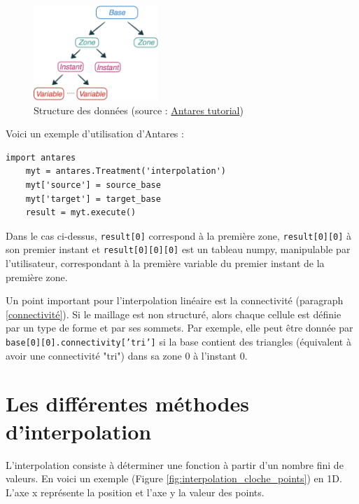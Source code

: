 \begin{figure}[H]
\centering
\includegraphics[width=0.42\textwidth]{images/data_structure_1.png}
\caption{Structure des données (source : \href{https://cerfacs.fr/antares/src/tutorial/base.html}{Antares tutorial})}
\label{fig:structure_antares}
\end{figure}

Voici un exemple d'utilisation d'Antares :

\begin{lstlisting}[caption=Exemple simple d'utilisation d'Antares (traitement d'interpolation), label={lst:antares_2}]
    import antares
    myt = antares.Treatment('interpolation')
    myt['source'] = source_base
    myt['target'] = target_base
    result = myt.execute()
\end{lstlisting}

Dans le cas ci-dessus, \texttt{result[0]} correspond à la première zone, \texttt{result[0][0]} à son premier instant et \texttt{result[0][0][0]} est un tableau numpy, manipulable par l'utilisateur, correspondant à la première variable du premier instant de la première zone.

Un point important pour l'interpolation linéaire est la connectivité (paragraph \ref{connectivité}). Si le maillage est non structuré, alors chaque cellule est définie par un type de forme et par ses sommets. Par exemple, elle peut être donnée par \texttt{base[0][0].connectivity['tri']} si la base contient des triangles (équivalent à avoir une connectivité "tri") dans sa zone 0 à l'instant 0.


\newpage
\section{Les différentes méthodes d'interpolation}

L'interpolation consiste à déterminer une fonction à partir d'un nombre fini de valeurs. En voici un exemple (Figure \ref{fig:interpolation_cloche_points}) en \ac{1D}. L'axe x représente la position et l'axe y la valeur des points.

